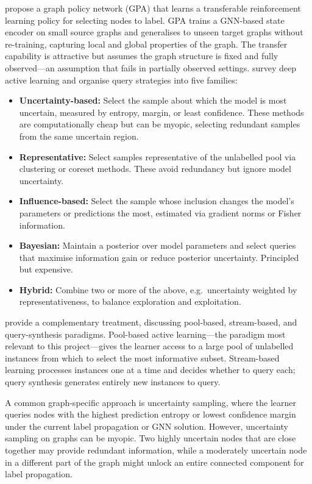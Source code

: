 \documentclass[12pt,a4paper,oneside]{report}
\begin{document}
\citet{gpa} propose a graph policy network (GPA) that learns a transferable reinforcement learning policy for selecting nodes to label. GPA trains a GNN-based state encoder on small source graphs and generalises to unseen target graphs without re-training, capturing local and global properties of the graph. The transfer capability is attractive but assumes the graph structure is fixed and fully observed---an assumption that fails in partially observed settings. \citet{li_survey} survey deep active learning and organise query strategies into five families:
\begin{itemize}[leftmargin=2em]
    \item \textbf{Uncertainty-based:} Select the sample about which the model is most uncertain, measured by entropy, margin, or least confidence. These methods are computationally cheap but can be myopic, selecting redundant samples from the same uncertain region.
    \item \textbf{Representative:} Select samples representative of the unlabelled pool via clustering or coreset methods. These avoid redundancy but ignore model uncertainty.
    \item \textbf{Influence-based:} Select the sample whose inclusion changes the model's parameters or predictions the most, estimated via gradient norms or Fisher information.
    \item \textbf{Bayesian:} Maintain a posterior over model parameters and select queries that maximise information gain or reduce posterior uncertainty. Principled but expensive.
    \item \textbf{Hybrid:} Combine two or more of the above, e.g.\ uncertainty weighted by representativeness, to balance exploration and exploitation.
\end{itemize}
\citet{ren} provide a complementary treatment, discussing pool-based, stream-based, and query-synthesis paradigms. Pool-based active learning---the paradigm most relevant to this project---gives the learner access to a large pool of unlabelled instances from which to select the most informative subset. Stream-based learning processes instances one at a time and decides whether to query each; query synthesis generates entirely new instances to query.

A common graph-specific approach is uncertainty sampling, where the learner queries nodes with the highest prediction entropy or lowest confidence margin under the current label propagation or GNN solution. However, uncertainty sampling on graphs can be myopic. Two highly uncertain nodes that are close together may provide redundant information, while a moderately uncertain node in a different part of the graph might unlock an entire connected component for label propagation.
\end{document}
